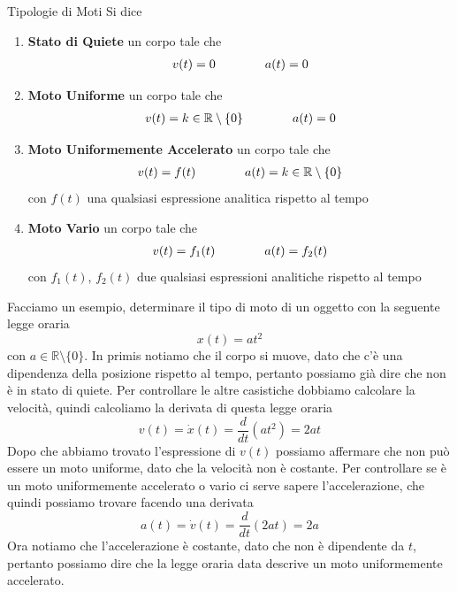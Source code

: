 \documentclass{rapport}
\begin{document}
\begin{definizione}{Tipologie di Moti}{}
  Si dice
  \begin{enumerate}[label=(\roman*)]
    \item \textbf{Stato di Quiete} un corpo tale che  
    \[\begin{array}{c@{\qquad}@{\qquad}c}
      v(t) = 0 & a(t) = 0
    \end{array}\]

    \item \textbf{Moto Uniforme} un corpo tale che  
    \[\begin{array}{c@{\qquad}@{\qquad}c}
      v(t) = k \in \mathbb{R} \setminus \{0\} & a(t) = 0
    \end{array}\]
    
  \item \textbf{Moto Uniformemente Accelerato} un corpo tale che  
    \[\begin{array}{c@{\qquad}@{\qquad}c}
      v(t) = f(t)  & a(t) = k \in \mathbb{R}\setminus \{0\}
    \end{array}\]
    con $f(t)$ una qualsiasi espressione analitica rispetto al tempo

    \item \textbf{Moto Vario} un corpo tale che  
   \[\begin{array}{c@{\qquad}@{\qquad}c}
      v(t) = f_1(t)  & a(t) = f_2(t)
    \end{array}\]
    con $f_1(t)$, $f_2(t)$ due qualsiasi espressioni analitiche rispetto al tempo

  \end{enumerate}
\end{definizione}

Facciamo un esempio, determinare il tipo di moto di un oggetto con la seguente legge oraria
\[
x(t) = at^2
\]
con $a \in \mathbb{R} \setminus \{0\}$. In primis notiamo che il corpo si muove, dato che c'è una dipendenza della posizione rispetto al tempo, pertanto possiamo già dire che non è in stato di quiete. Per controllare le altre casistiche dobbiamo calcolare la velocità, quindi calcoliamo la derivata di questa legge oraria
\[
v(t) = \dot{x}(t) = \dfrac{d}{dt}\left(at^2\right) = 2at
\]
Dopo che abbiamo trovato l'espressione di $v(t)$ possiamo affermare che non può essere un moto uniforme, dato che la velocità non è costante. Per controllare se è un moto uniformemente accelerato o vario ci serve sapere l'accelerazione, che quindi possiamo trovare facendo una derivata
\[
a(t) = \dot{v}(t)=\dfrac{d}{dt}\left(2at\right) = 2a
\]
Ora notiamo che l'accelerazione è costante, dato che non è dipendente da $t$, pertanto possiamo dire che la legge oraria data descrive un moto uniformemente accelerato.
\end{document}
